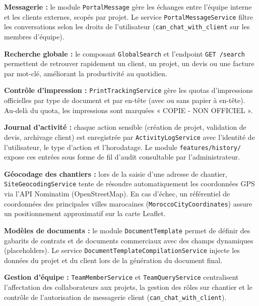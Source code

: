 \medskip

\textbf{Messagerie :} le module \texttt{PortalMessage} gère les échanges entre
l'équipe interne et les clients externes, scopés par projet. Le service
\texttt{PortalMessageService} filtre les conversations selon les droits de
l'utilisateur (\texttt{can\_chat\_with\_client} sur les membres d'équipe).

\medskip

\textbf{Recherche globale :} le composant \texttt{GlobalSearch} et l'endpoint
\texttt{GET /search} permettent de retrouver rapidement un client, un projet, un
devis ou une facture par mot-clé, améliorant la productivité au quotidien.

\medskip

\textbf{Contrôle d'impression :} \texttt{PrintTrackingService} gère les quotas
d'impressions officielles par type de document et par en-tête (avec ou sans papier
à en-tête). Au-delà du quota, les impressions sont marquées « COPIE - NON OFFICIEL ».

\medskip

\textbf{Journal d'activité :} chaque action sensible (création de projet, validation
de devis, archivage client) est enregistrée par \texttt{ActivityLogService} avec
l'identité de l'utilisateur, le type d'action et l'horodatage. Le module
\texttt{features/history/} expose ces entrées sous forme de fil d'audit consultable
par l'administrateur.

\medskip

\textbf{Géocodage des chantiers :} lors de la saisie d'une adresse de chantier,
\texttt{SiteGeocodingService} tente de résoudre automatiquement les coordonnées
GPS via l'API Nominatim (OpenStreetMap). En cas d'échec, un référentiel de
coordonnées des principales villes marocaines (\texttt{MoroccoCityCoordinates})
assure un positionnement approximatif sur la carte Leaflet.

\medskip

\textbf{Modèles de documents :} le module \texttt{DocumentTemplate} permet de
définir des gabarits de contrats et de documents commerciaux avec des champs
dynamiques (placeholders). Le service \texttt{DocumentTemplateCompilationService}
injecte les données du projet et du client lors de la génération du document final.

\medskip

\textbf{Gestion d'équipe :} \texttt{TeamMemberService} et \texttt{TeamQueryService}
centralisent l'affectation des collaborateurs aux projets, la gestion des rôles
sur chantier et le contrôle de l'autorisation de messagerie client
(\texttt{can\_chat\_with\_client}).

